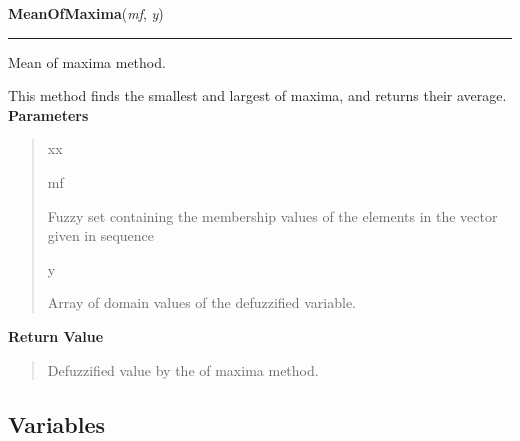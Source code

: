 \hspace{.8\funcindent}\begin{boxedminipage}{\funcwidth}

    \raggedright \textbf{MeanOfMaxima}(\textit{mf}, \textit{y})

    \vspace{-1.5ex}

    \rule{\textwidth}{0.5\fboxrule}
\setlength{\parskip}{2ex}

Mean of maxima method.

This method finds the smallest and largest of maxima, and returns their
average.
\setlength{\parskip}{1ex}
      \textbf{Parameters}
      \vspace{-1ex}

      \begin{quote}
        \begin{Ventry}{xx}

          \item[mf]


Fuzzy set containing the membership values of the elements in the
vector given in sequence
          \item[y]


Array of domain values of the defuzzified variable.
        \end{Ventry}

      \end{quote}

      \textbf{Return Value}
    \vspace{-1ex}

      \begin{quote}

Defuzzified value by the  of maxima method.
      \end{quote}

    \end{boxedminipage}



  \subsection{Variables}

